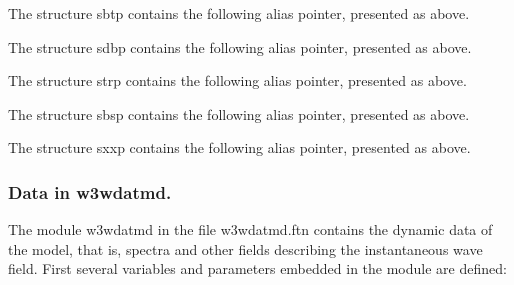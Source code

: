 \noindent
The structure {\F sbtp} contains the following alias pointer, presented as
above.

\begin{vlist}
\end{vlist}

\noindent
The structure {\F sdbp} contains the following alias pointer, presented as
above.

\begin{vlist}
\end{vlist}

\noindent
The structure {\F strp} contains the following alias pointer, presented as
above.

\begin{vlist}
\end{vlist}

\noindent
The structure {\F sbsp} contains the following alias pointer, presented as
above.

\begin{vlist}
\end{vlist}

\noindent
The structure {\F sxxp} contains the following alias pointer, presented as
above.

\begin{vlist}
\end{vlist}


\vspace{8mm}
\subsubsection{Data in {\F w3wdatmd}.} \label{sub:wdatmd}

The module {\F w3wdatmd} in the file {\file w3wdatmd.ftn} contains the dynamic
data of the model, that is, spectra and other fields describing the
instantaneous wave field. First several variables and parameters embedded in
the module are defined:

